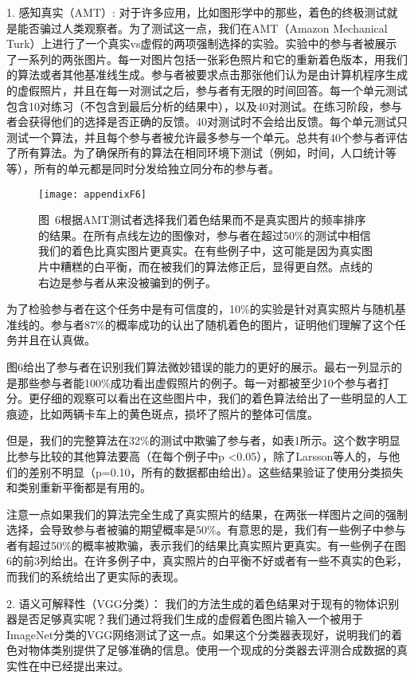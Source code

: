 1. {\heiti 感知真实（AMT）: } 对于许多应用，比如图形学中的那些，着色的终极测试就是能否骗过人类观察者。为了测试这一点，我们在AMT（Amazon Mechanical Turk）上进行了一个真实vs虚假的两项强制选择的实验。实验中的参与者被展示了一系列的两张图片。每一对图片包括一张彩色照片和它的重新着色版本，用我们的算法或者其他基准线生成。参与者被要求点击那张他们认为是由计算机程序生成的虚假照片，并且在每一对测试之后，参与者有无限的时间回答。每一个单元测试包含10对练习（不包含到最后分析的结果中），以及40对测试。在练习阶段，参与者会获得他们的选择是否正确的反馈。40对测试时不会给出反馈。每个单元测试只测试一个算法，并且每个参与者被允许最多参与一个单元。总共有40个参与者评估了所有算法。为了确保所有的算法在相同环境下测试（例如，时间，人口统计等等），所有的单元都是同时分发给独立同分布的参与者。

\begin{figure}[h]
  \centering
  \texttt{[image: appendixF6]}
  \caption*{图~6\quad 根据AMT测试者选择我们着色结果而不是真实图片的频率排序的结果。在所有点线左边的图像对，参与者在超过50\%的测试中相信我们的着色比真实图片更真实。在有些例子中，这可能是因为真实图片中糟糕的白平衡，而在被我们的算法修正后，显得更自然。点线的右边是参与者从来没被骗到的例子。}
  \label{tab:badfigure7}
\end{figure}

为了检验参与者在这个任务中是有可信度的，10\%的实验是针对真实照片与随机基准线的。参与者87\%的概率成功的认出了随机着色的图片，证明他们理解了这个任务并且在认真做。

图6给出了参与者在识别我们算法微妙错误的能力的更好的展示。最右一列显示的是那些参与者能100\%成功看出虚假照片的例子。每一对都被至少10个参与者打分。更仔细的观察可以看出在这些图片中，我们的着色算法给出了一些明显的人工痕迹，比如两辆卡车上的黄色斑点，损坏了照片的整体可信度。

但是，我们的完整算法在32\%的测试中欺骗了参与者，如表1所示。这个数字明显比参与比较的其他算法要高（在每个例子中p <0.05），除了Larsson等人的，与他们的差别不明显（p=0.10，所有的数据都由给出）。这些结果验证了使用分类损失和类别重新平衡都是有用的。

注意一点如果我们的算法完全生成了真实照片的结果，在两张一样图片之间的强制选择，会导致参与者被骗的期望概率是50\%。有意思的是，我们有一些例子中参与者有超过50\%的概率被欺骗，表示我们的结果比真实照片更真实。有一些例子在图6的前3列给出。在许多例子中，真实照片的白平衡不好或者有一些不真实的色彩，而我们的系统给出了更实际的表现。

2. {\heiti 语义可解释性（VGG分类）： } 我们的方法生成的着色结果对于现有的物体识别器是否足够真实呢？我们通过将我们生成的虚假着色图片输入一个被用于ImageNet分类的VGG网络测试了这一点。如果这个分类器表现好，说明我们的着色对物体类别提供了足够准确的信息。使用一个现成的分类器去评测合成数据的真实性在中已经提出来过。

